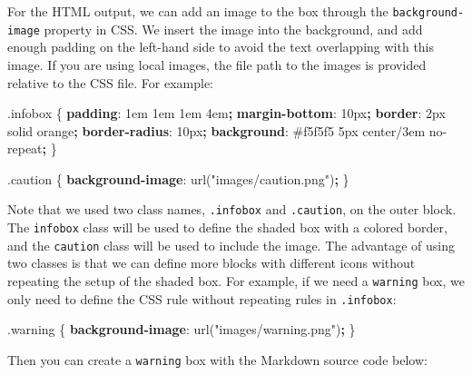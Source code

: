 \documentclass[
  11pt,
]{krantz}
\newenvironment{Shaded}{\begin{snugshade}}{\end{snugshade}}
\newcommand{\ConstantTok}[1]{\textcolor[rgb]{0,0,0}{#1}}
\newcommand{\DataTypeTok}[1]{\textcolor[rgb]{0.27,0.27,0.27}{#1}}
\newcommand{\DecValTok}[1]{\textcolor[rgb]{0.06,0.06,0.06}{#1}}
\newcommand{\FunctionTok}[1]{\textcolor[rgb]{0,0,0}{#1}}
\newcommand{\KeywordTok}[1]{\textcolor[rgb]{0.27,0.27,0.27}{\textbf{#1}}}
\newcommand{\NormalTok}[1]{#1}
\newcommand{\OperatorTok}[1]{\textcolor[rgb]{0.43,0.43,0.43}{\textbf{#1}}}
\newcommand{\StringTok}[1]{\textcolor[rgb]{0.5,0.5,0.5}{#1}}
\begin{document}
For the HTML output, we can add an image to the box through the \texttt{background-image} property in CSS. We insert the image into the background, and add enough padding on the left-hand side to avoid the text overlapping with this image. If you are using local images, the file path to the images is provided relative to the CSS file. For example:

\begin{Shaded}
\begin{Highlighting}[]
\FunctionTok{.infobox}\NormalTok{ \{}
  \KeywordTok{padding}\NormalTok{: }\DecValTok{1}\DataTypeTok{em} \DecValTok{1}\DataTypeTok{em} \DecValTok{1}\DataTypeTok{em} \DecValTok{4}\DataTypeTok{em}\OperatorTok{;}
  \KeywordTok{margin-bottom}\NormalTok{: }\DecValTok{10}\DataTypeTok{px}\OperatorTok{;}
  \KeywordTok{border}\NormalTok{: }\DecValTok{2}\DataTypeTok{px} \DecValTok{solid} \ConstantTok{orange}\OperatorTok{;}
  \KeywordTok{border-radius}\NormalTok{: }\DecValTok{10}\DataTypeTok{px}\OperatorTok{;}
  \KeywordTok{background}\NormalTok{: }\ConstantTok{#f5f5f5} \DecValTok{5}\DataTypeTok{px} \DecValTok{center}\NormalTok{/}\DecValTok{3}\DataTypeTok{em} \DecValTok{no-repeat}\OperatorTok{;}
\NormalTok{\}}

\FunctionTok{.caution}\NormalTok{ \{}
  \KeywordTok{background-image}\NormalTok{: }\FunctionTok{url(}\StringTok{"images/caution.png"}\FunctionTok{)}\OperatorTok{;}
\NormalTok{\}}
\end{Highlighting}
\end{Shaded}

Note that we used two class names, \texttt{.infobox} and \texttt{.caution}, on the outer block. The \texttt{infobox} class will be used to define the shaded box with a colored border, and the \texttt{caution} class will be used to include the image. The advantage of using two classes is that we can define more blocks with different icons without repeating the setup of the shaded box. For example, if we need a \texttt{warning} box, we only need to define the CSS rule without repeating rules in \texttt{.infobox}:

\begin{Shaded}
\begin{Highlighting}[]
\FunctionTok{.warning}\NormalTok{ \{}
  \KeywordTok{background-image}\NormalTok{: }\FunctionTok{url(}\StringTok{"images/warning.png"}\FunctionTok{)}\OperatorTok{;}
\NormalTok{\}}
\end{Highlighting}
\end{Shaded}

Then you can create a \texttt{warning} box with the Markdown source code below:
\end{document}
